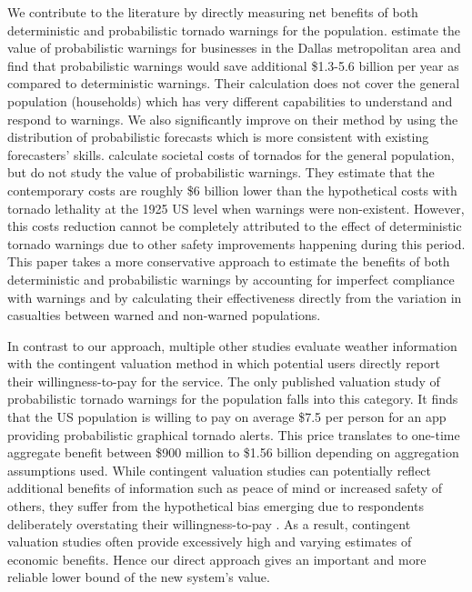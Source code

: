 \documentclass{ametsocV6.1}
\begin{document}
We contribute to the literature by directly measuring net benefits of both deterministic and probabilistic tornado warnings for the population. \cite{howard_firm_2021} estimate the value of probabilistic warnings for businesses in the Dallas metropolitan area and find that probabilistic warnings would save additional \$1.3-5.6 billion per year as compared to deterministic warnings. Their calculation does not cover the general population (households) which has very different capabilities to understand and respond to warnings. We also significantly improve on their method by using the distribution of probabilistic forecasts which is more consistent with existing forecasters' skills.  \citet{simmons_economic_2013} calculate societal costs of tornados for the general population, but do not study the value of probabilistic warnings. They estimate that the contemporary costs are roughly \$6 billion lower than the hypothetical costs with tornado lethality at the 1925 US level when warnings were non-existent. However, this costs reduction cannot be completely attributed to the effect of deterministic tornado warnings due to other safety improvements happening during this period. This paper takes a more conservative approach to estimate the benefits of both deterministic and probabilistic warnings by accounting for imperfect compliance with warnings and by calculating their effectiveness directly from the variation in casualties between warned and non-warned populations. 

In contrast to our approach, multiple other studies evaluate weather information \citep{lazo_economic_2002, lazo_300_2009, lazo_valuing_2011, wehde_public_2021-1} with the contingent valuation method in which potential users directly report their willingness-to-pay for the service. The only published valuation study of probabilistic tornado warnings for the population \citet{wehde_public_2021-1} falls into this category. It finds that the US population is willing to pay on average \$7.5 per person for an app providing probabilistic graphical tornado alerts. This price translates to one-time aggregate benefit between \$900 million to \$1.56 billion depending on aggregation assumptions used. While contingent valuation studies can potentially reflect additional benefits of information such as peace of mind or increased safety of others, they suffer from the hypothetical bias emerging due to respondents deliberately overstating their willingness-to-pay \citep{blumenschein_eliciting_2008, johnston_contemporary_2017}.  As a result, contingent valuation studies often provide excessively high and varying estimates of economic benefits. Hence our direct approach gives an important and more reliable lower bound of the new system's value. 
\end{document}
